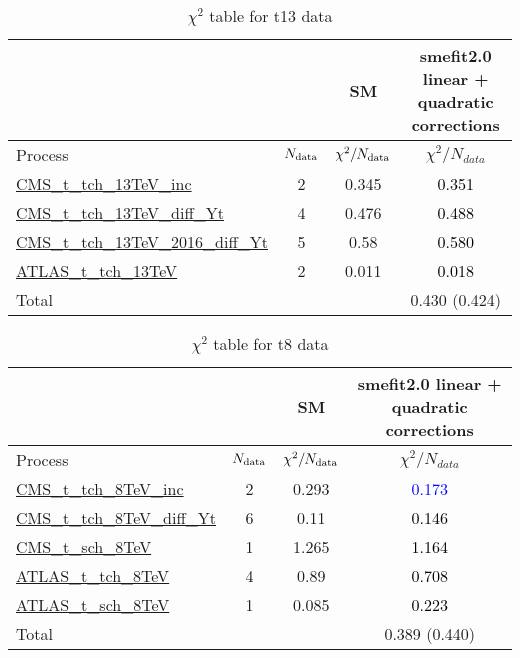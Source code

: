 \documentclass{article}
\begin{document}
\begin{table}[H]
\centering
\begin{tabular}{|l|c|c|c|}
\hline
 \multicolumn{2}{|c|}{} & SM& smefit2.0 linear + quadratic corrections\\ \hline
Process & $N_{\rm data}$ & $\chi^ 2/N_{\rm data}$& $\chi^ 2/N_{data}$\\ \hline
\href{https://arxiv.org/abs/1610.00678}{CMS_t_tch_13TeV_inc} & 2 & 0.345 & \textcolor{black}                            {0.351} \\ \hline
\href{https://cds.cern.ch/record/2151074}{CMS_t_tch_13TeV_diff_Yt} & 4 & 0.476 & \textcolor{black}                            {0.488} \\ \hline
\href{https://arxiv.org/abs/1907.08330}{CMS_t_tch_13TeV_2016_diff_Yt} & 5 & 0.58 & \textcolor{black}                            {0.580} \\ \hline
\href{https://arxiv.org/abs/1609.03920}{ATLAS_t_tch_13TeV} & 2 & 0.011 & \textcolor{black}                            {0.018} \\ \hline
\hline Total & &  & 0.430 (0.424) \\ \hline
\end{tabular}
\caption{$\chi^2$ table for t13 data}
\end{table}
\begin{table}[H]
\centering
\begin{tabular}{|l|c|c|c|}
\hline
 \multicolumn{2}{|c|}{} & SM& smefit2.0 linear + quadratic corrections\\ \hline
Process & $N_{\rm data}$ & $\chi^ 2/N_{\rm data}$& $\chi^ 2/N_{data}$\\ \hline
\href{https://arxiv.org/abs/1403.7366}{CMS_t_tch_8TeV_inc} & 2 & 0.293 & \textcolor{blue}                            {0.173} \\ \hline
\href{https://cds.cern.ch/record/1956681}{CMS_t_tch_8TeV_diff_Yt} & 6 & 0.11 & \textcolor{black}                            {0.146} \\ \hline
\href{https://arxiv.org/abs/1603.02555}{CMS_t_sch_8TeV} & 1 & 1.265 & \textcolor{black}                            {1.164} \\ \hline
\href{https://arxiv.org/abs/1702.02859}{ATLAS_t_tch_8TeV} & 4 & 0.89 & \textcolor{black}                            {0.708} \\ \hline
\href{https://arxiv.org/abs/1511.05980}{ATLAS_t_sch_8TeV} & 1 & 0.085 & \textcolor{black}                            {0.223} \\ \hline
\hline Total & &  & 0.389 (0.440) \\ \hline
\end{tabular}
\caption{$\chi^2$ table for t8 data}
\end{table}
\end{document}
